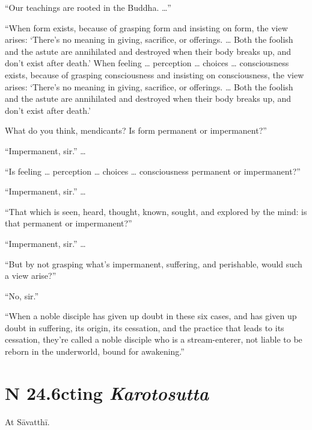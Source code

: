\documentclass[12pt,openany]{book}%
\newcommand*{\suttatitleacronym}[1]{\smaller[2]{#1}\vspace*{.3em}}
\newcommand*{\suttatitletranslation}[1]{\linebreak{#1}}
\newcommand*{\suttatitleroot}[1]{\linebreak\smaller[2]\itshape{#1}}
\newcommand*{\tocacronym}[1]{\hspace*{-3.3em}{#1}\quad}
\newcommand*{\toctranslation}[1]{#1}
\newcommand*{\tocroot}[1]{(\textit{#1})}
\begin{document}
“Our teachings are rooted in the Buddha. …” 

“When form exists, because of grasping form and insisting on form, the view arises: ‘There’s no meaning in giving, sacrifice, or offerings. … Both the foolish and the astute are annihilated and destroyed when their body breaks up, and don’t exist after death.’ When feeling … perception … choices … consciousness exists, because of grasping consciousness and insisting on consciousness, the view arises: ‘There’s no meaning in giving, sacrifice, or offerings. … Both the foolish and the astute are annihilated and destroyed when their body breaks up, and don’t exist after death.’ 

What do you think, mendicants? Is form permanent or impermanent?” 

“Impermanent, sir.” … 

“Is feeling … perception … choices … consciousness permanent or impermanent?” 

“Impermanent, sir.” … 

“That which is seen, heard, thought, known, sought, and explored by the mind: is that permanent or impermanent?” 

“Impermanent, sir.” … 

“But by not grasping what’s impermanent, suffering, and perishable, would such a view arise?” 

“No, sir.” 

“When a noble disciple has given up doubt in these six cases, and has given up doubt in suffering, its origin, its cessation, and the practice that leads to its cessation, they’re called a noble disciple who is a stream-enterer, not liable to be reborn in the underworld, bound for awakening.” 

%
\section*{{\suttatitleacronym SN 24.6}{\suttatitletranslation Acting }{\suttatitleroot Karotosutta}}
\addcontentsline{toc}{section}{\tocacronym{SN 24.6} \toctranslation{Acting } \tocroot{Karotosutta}}

At \textsanskrit{Sāvatthī}. 
\end{document}
